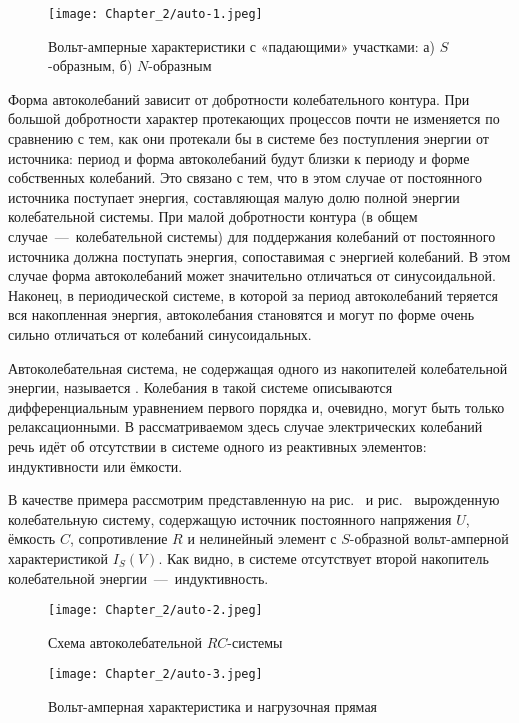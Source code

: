 \begin{figure}
	\centering
	\texttt{[image: Chapter\_2/auto-1.jpeg]}
	\caption{Вольт-амперные характеристики с «падающими» участками:	а) $S$-образным, б) $N$-образным}
\end{figure}

Форма автоколебаний зависит от добротности колебательного контура. При большой добротности характер протекающих процессов почти не изменяется по сравнению с тем, как они протекали бы в системе без поступления
энергии от источника: период и форма автоколебаний будут близки к периоду и форме собственных колебаний. Это связано с тем, что в этом случае от постоянного источника поступает энергия, составляющая малую
долю полной энергии колебательной системы. При малой добротности контура (в общем случае~---~колебательной системы) для поддержания колебаний от постоянного источника должна поступать энергия, сопоставимая с энергией колебаний. В этом случае форма автоколебаний может значительно отличаться от синусоидальной. Наконец, в периодической системе, в которой за период автоколебаний теряется вся накопленная энергия, автоколебания становятся  и могут по форме очень сильно отличаться от колебаний синусоидальных.

Автоколебательная система, не содержащая одного из накопителей колебательной энергии, называется . Колебания в такой системе описываются дифференциальным уравнением первого порядка и, очевидно, могут быть только релаксационными. В рассматриваемом здесь случае электрических колебаний речь идёт об отсутствии в системе одного из реактивных элементов: индуктивности или ёмкости.

В качестве примера рассмотрим представленную на рис.~ и рис.~ вырожденную колебательную систему, содержащую источник постоянного напряжения $U$, ёмкость $C$, сопротивление $R$ и нелинейный элемент с $S$-образной вольт-амперной характеристикой $I_S(V)$. Как видно, в системе отсутствует второй накопитель колебательной энергии~---~индуктивность.

\begin{figure}
	\centering
	\texttt{[image: Chapter\_2/auto-2.jpeg]}
	\caption{Схема автоколебательной $RC$-системы}
\end{figure}

\begin{figure}
	\centering
	\texttt{[image: Chapter\_2/auto-3.jpeg]}
	\caption{Вольт-амперная характеристика и нагрузочная прямая}						
\end{figure}


